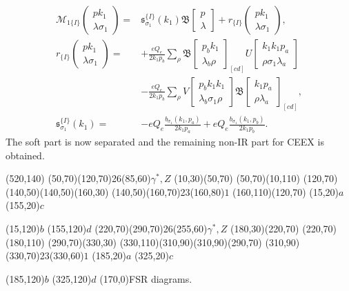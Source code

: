 \begin{align}
\mathcal{M}_{1\{I\}}\left(\begin{array}{c}
pk_1\\\lambda\sigma_1
\end{array}\right)=&\mathfrak{s}^{\{I\}}_{\sigma_1}(k_1)\mathfrak{B}\left[\begin{array}{c}
p\\\lambda
\end{array}\right]+r_{\{I\}}\left(\begin{array}{c}
pk_1\\\lambda\sigma_1
\end{array}\right),\nonumber\\
r_{\{I\}}\left(\begin{array}{c}
pk_1\\\lambda\sigma_1
\end{array}\right)=&+\frac{eQ_e}{2k_1p_b}\sum_\rho\mathfrak{B}\left[\begin{array}{c}
p_bk_1\\\lambda_b\rho
\end{array}\right]_{[cd]}U\left[\begin{array}{c}
k_1k_1p_a\\\rho\sigma_1\lambda_a
\end{array}\right]\nonumber\\
&-\frac{eQ_e}{2k_1p_b}\sum_\rho V\left[\begin{array}{c}
p_bk_1k_1\\\lambda_b\sigma_1\rho
\end{array}\right]
\mathfrak{B}\left[\begin{array}{c}
k_1p_a\\\rho\lambda_a\
\end{array}\right]_{[cd]},\nonumber\\
\mathfrak{s}^{\{I\}}_{\sigma_1}(k_1)=&-eQ_e\frac{b_{\sigma_1}(k_1,p_a)}{2k_1p_a}+eQ_e\frac{b_{\sigma_1}(k_1,p_b)}{2k_1p_b}.
\end{align}
The soft part is now separated and the remaining non-IR part for CEEX is obtained.

\begin{axopicture}(520,140)
	\Photon(50,70)(120,70){2}{6}\Text(85,60){$\gamma^\ast,Z$}
	\Line[arrow](10,30)(50,70)
	\Line[arrow](50,70)(10,110)
	\Line[arrow](120,70)(140,50)\Line[arrow](140,50)(160,30)
	\Photon(140,50)(160,70){2}{3}\Text(160,80){$1$}
	\Line[arrow](160,110)(120,70)
	\Text(15,20){$a$}
	\Text(155,20){$c$}
	
	\Text(15,120){$b$}
	\Text(155,120){$d$}
	\Photon(220,70)(290,70){2}{6}\Text(255,60){$\gamma^\ast,Z$}
	\Line[arrow](180,30)(220,70)
	\Line[arrow](220,70)(180,110)
	\Line[arrow](290,70)(330,30)
	\Line[arrow](330,110)(310,90)\Line[arrow](310,90)(290,70)
	\Photon(310,90)(330,70){2}{3}\Text(330,60){$1$}
	\Text(185,20){$a$}
	\Text(325,20){$c$}
	
	\Text(185,120){$b$}
	\Text(325,120){$d$}
	\Text(170,0){FSR diagrams.}
\end{axopicture}
\\ \newline\newline

